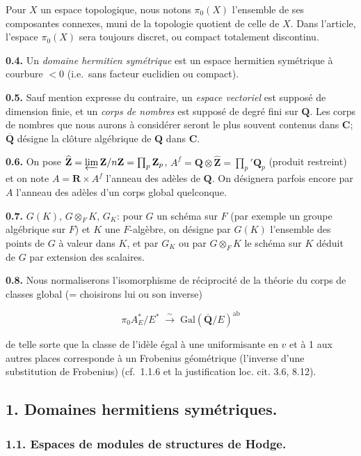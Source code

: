 \documentclass[10pt,a4paper]{article}
\begin{document}
Pour \(X\) un espace topologique, nous notons \(\pi_0(X)\) l'ensemble de ses composantes connexes, muni de la topologie quotient de celle de \(X\). Dans l'article, l'espace \(\pi_0(X)\) sera toujours discret, ou compact totalement discontinu.

\textbf{0.4.} Un \emph{domaine hermitien symétrique} est un espace hermitien symétrique à courbure \(<0\) (i.e.~sans facteur euclidien ou compact).

\textbf{0.5.} Sauf mention expresse du contraire, un \emph{espace vectoriel} est supposé de dimension finie, et un \emph{corps de nombres} est supposé de degré fini sur \(\mathbf Q\). Les corps de nombres que nous aurons à considérer seront le plus souvent contenus dans \(\mathbf C\); \(\overline{\mathbf Q}\) désigne la clôture algébrique de \(\mathbf Q\) dans \(\mathbf C\).

\textbf{0.6.} On pose \(\widehat{\mathbf Z}=\varprojlim \mathbf Z/n\mathbf Z=\prod_p\mathbf Z_p\), \(A^f=\mathbf Q\otimes\widehat{\mathbf Z}=\prod_p'\mathbf Q_p\) (produit restreint) et on note \(A=\mathbf R\times A^f\) l'anneau des adèles de \(\mathbf Q\). On désignera parfois encore par \(A\) l'anneau des adèles d'un corps global quelconque.

\textbf{0.7.} \(G(K)\), \(G\otimes_FK\), \(G_K\): pour \(G\) un schéma sur \(F\) (par exemple un groupe algébrique sur \(F\)) et \(K\) une \(F\)-algèbre, on désigne par \(G(K)\) l'ensemble des points de \(G\) à valeur dans \(K\), et par \(G_K\) ou par \(G\otimes_FK\) le schéma sur \(K\) déduit de \(G\) par extension des scalaires.

\textbf{0.8.} Nous normaliserons l'isomorphisme de réciprocité de la théorie du corps de classes global (= choisirons lui ou son inverse)

\[
\pi_0 A_E^*/E^*\;\xrightarrow{\sim}\;\mathrm{Gal}(\overline{\mathbf Q}/E)^{\mathrm{ab}}
\]

de telle sorte que la classe de l'idèle égal à une uniformisante en \(v\) et à 1 aux autres places corresponde à un Frobenius géométrique (l'inverse d'une substitution de Frobenius) (cf.~1.1.6 et la justification loc. cit. 3.6, 8.12).

\subsection{1. Domaines hermitiens symétriques.}

\subsubsection{1.1. Espaces de modules de structures de Hodge.}
\end{document}
